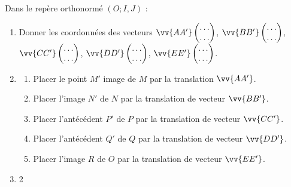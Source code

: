 \begin{exercise}
\begin{minipage}{1\columnwidth}
	\end{minipage}
	
	Dans le repère orthonormé $(O; I,J)$ :  
	\begin{enumerate}[leftmargin=*, label=\arabic*)]
		\item Donner les coordonnées des vecteurs $\vv{AA'}\begin{pmatrix}
			\ldots \\ \ldots
		\end{pmatrix}$, $\vv{BB'}\begin{pmatrix}
			\ldots \\ \ldots
		\end{pmatrix}$, $\vv{CC'}\begin{pmatrix}
			\ldots \\ \ldots
		\end{pmatrix}$, $\vv{DD'}\begin{pmatrix}
			\ldots \\ \ldots
		\end{pmatrix}$, $\vv{EE'}\begin{pmatrix}
			\ldots \\ \ldots
		\end{pmatrix}$. 
		\item \begin{enumerate}[leftmargin=*, label=\alph*)]
			\item Placer le point $M'$ image de $M$ par la translation $\vv{AA'}$.
			\item Placer l'image $N'$ de $N$ par la translation de vecteur $\vv{BB'}$.
			\item Placer l'antécédent $P'$ de $P$ par la translation de vecteur $\vv{CC'}$. 
			\item Placer l'antécédent $Q'$ de $Q$ par la translation de vecteur $\vv{DD'}$.  
			\item Placer l'image $R$ de $O$ par la translation de vecteur $\vv{EE'}$.      
		\end{enumerate}  
		\item \begin{multicols}{2} 

\end{multicols}
\end{enumerate}
\end{exercise}
